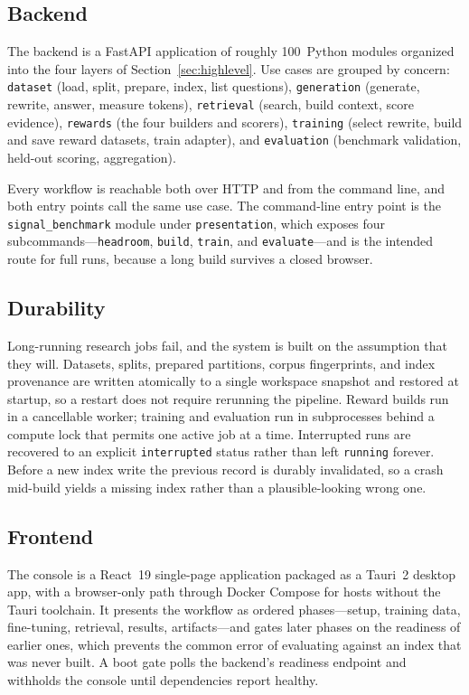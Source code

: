 \documentclass[12pt,letterpaper,oneside]{report}
\newcommand{\code}[1]{\texttt{\small #1}}
\begin{document}
\subsection{Backend}

The backend is a FastAPI application of roughly 100~Python modules organized
into the four layers of Section~\ref{sec:highlevel}. Use cases are grouped by
concern: \code{dataset} (load, split, prepare, index, list questions),
\code{generation} (generate, rewrite, answer, measure tokens),
\code{retrieval} (search, build context, score evidence), \code{rewards}
(the four builders and scorers), \code{training} (select rewrite, build and
save reward datasets, train adapter), and \code{evaluation} (benchmark
validation, held-out scoring, aggregation).

Every workflow is reachable both over HTTP and from the command line, and both
entry points call the same use case. The command-line entry point is the
\code{signal\_benchmark} module under \code{presentation}, which exposes four
subcommands---\code{headroom}, \code{build}, \code{train}, and
\code{evaluate}---and is the intended route for full runs, because a long
build survives a closed browser.

\subsection{Durability}

Long-running research jobs fail, and the system is built on the assumption that
they will. Datasets, splits, prepared partitions, corpus fingerprints, and
index provenance are written atomically to a single workspace snapshot and
restored at startup, so a restart does not require rerunning the pipeline.
Reward builds run in a cancellable worker; training and evaluation run in
subprocesses behind a compute lock that permits one active job at a time.
Interrupted runs are recovered to an explicit \code{interrupted} status rather
than left \code{running} forever. Before a new index write the previous record
is durably invalidated, so a crash mid-build yields a missing index rather than
a plausible-looking wrong one.

\subsection{Frontend}

The console is a React~19 single-page application packaged as a Tauri~2 desktop
app, with a browser-only path through Docker Compose for hosts without the
Tauri toolchain. It presents the workflow as ordered phases---setup, training
data, fine-tuning, retrieval, results, artifacts---and gates later phases on
the readiness of earlier ones, which prevents the common error of evaluating
against an index that was never built. A boot gate polls the backend's
readiness endpoint and withholds the console until dependencies report healthy.
\end{document}
